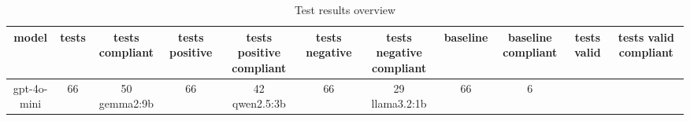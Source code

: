 
  \begin{table}[h!]
  \centering
  \begin{tabular}{|c|c|c|c|c|c|c|c|c|c|c|}
  \hline
  model & tests & tests compliant & tests positive & tests positive compliant & tests negative & tests negative compliant & baseline & baseline compliant & tests valid & tests valid compliant \\
  \hline
  gpt-4o-mini & 66 & 50%
\hline
gemma2:9b & 66 & 42%
\hline
qwen2.5:3b & 66 & 29%
\hline
llama3.2:1b & 66 & 6%
  \end{tabular}
  \caption{Test results overview}
  
  \end{table}
  